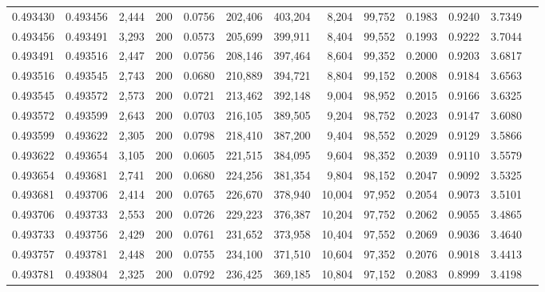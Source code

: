 \begin{tabular}{rrrrrrrrrrrrr}
0.493430 & 0.493456 &  2,444 & 200 &                                     0.0756 & 202,406 & 403,204 &   8,204 &  99,752 & 0.1983 & 0.9240 & 3.7349 \\
0.493456 & 0.493491 &  3,293 & 200 &                                     0.0573 & 205,699 & 399,911 &   8,404 &  99,552 & 0.1993 & 0.9222 & 3.7044 \\
0.493491 & 0.493516 &  2,447 & 200 &                                     0.0756 & 208,146 & 397,464 &   8,604 &  99,352 & 0.2000 & 0.9203 & 3.6817 \\
0.493516 & 0.493545 &  2,743 & 200 &                                     0.0680 & 210,889 & 394,721 &   8,804 &  99,152 & 0.2008 & 0.9184 & 3.6563 \\
0.493545 & 0.493572 &  2,573 & 200 &                                     0.0721 & 213,462 & 392,148 &   9,004 &  98,952 & 0.2015 & 0.9166 & 3.6325 \\
0.493572 & 0.493599 &  2,643 & 200 &                                     0.0703 & 216,105 & 389,505 &   9,204 &  98,752 & 0.2023 & 0.9147 & 3.6080 \\
0.493599 & 0.493622 &  2,305 & 200 &                                     0.0798 & 218,410 & 387,200 &   9,404 &  98,552 & 0.2029 & 0.9129 & 3.5866 \\
0.493622 & 0.493654 &  3,105 & 200 &                                     0.0605 & 221,515 & 384,095 &   9,604 &  98,352 & 0.2039 & 0.9110 & 3.5579 \\
0.493654 & 0.493681 &  2,741 & 200 &                                     0.0680 & 224,256 & 381,354 &   9,804 &  98,152 & 0.2047 & 0.9092 & 3.5325 \\
0.493681 & 0.493706 &  2,414 & 200 &                                     0.0765 & 226,670 & 378,940 &  10,004 &  97,952 & 0.2054 & 0.9073 & 3.5101 \\
0.493706 & 0.493733 &  2,553 & 200 &                                     0.0726 & 229,223 & 376,387 &  10,204 &  97,752 & 0.2062 & 0.9055 & 3.4865 \\
0.493733 & 0.493756 &  2,429 & 200 &                                     0.0761 & 231,652 & 373,958 &  10,404 &  97,552 & 0.2069 & 0.9036 & 3.4640 \\
0.493757 & 0.493781 &  2,448 & 200 &                                     0.0755 & 234,100 & 371,510 &  10,604 &  97,352 & 0.2076 & 0.9018 & 3.4413 \\
0.493781 & 0.493804 &  2,325 & 200 &                                     0.0792 & 236,425 & 369,185 &  10,804 &  97,152 & 0.2083 & 0.8999 & 3.4198 \\

\end{tabular}
